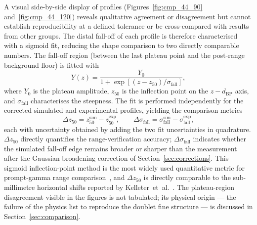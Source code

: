 \documentclass[a4paper]{article}
\begin{document}
A visual side-by-side display of profiles (Figures~\ref{fig:cmp_44_90} and~\ref{fig:cmp_44_120}) reveals qualitative agreement or disagreement but cannot establish reproducibility at a defined tolerance or be cross-compared with results from other groups. The distal fall-off of each profile is therefore characterised with a sigmoid fit, reducing the shape comparison to two directly comparable numbers. The fall-off region (between the last plateau point and the post-range background floor) is fitted with
\begin{equation}
    Y(z) = \frac{Y_0}{1 + \exp\!\left[(z - z_{50})/\sigma_\mathrm{fall}\right]},
    \label{eq:sigmoid}
\end{equation}
where $Y_0$ is the plateau amplitude, $z_{50}$ is the inflection point on the $z - d_\mathrm{BP}$ axis, and $\sigma_\mathrm{fall}$ characterises the steepness. The fit is performed independently for the corrected simulated and experimental profiles, yielding the comparison metrics
\begin{equation}
    \Delta z_{50} = z_{50}^\mathrm{sim} - z_{50}^\mathrm{exp}, \qquad
    \Delta\sigma_\mathrm{fall} = \sigma_\mathrm{fall}^\mathrm{sim} - \sigma_\mathrm{fall}^\mathrm{exp},
    \label{eq:deltaz50}
\end{equation}
each with uncertainty obtained by adding the two fit uncertainties in quadrature. $\Delta z_{50}$ directly quantifies the range-verification accuracy; $\Delta\sigma_\mathrm{fall}$ indicates whether the simulated fall-off edge remains broader or sharper than the measurement after the Gaussian broadening correction of Section~\ref{sec:corrections}. This sigmoid inflection-point method is the most widely used quantitative metric for prompt-gamma range comparison~\cite{janssen2014,pinto2015,valencialozano2023}, and $\Delta z_{50}$ is directly comparable to the sub-millimetre horizontal shifts reported by Kelleter~et~al.~\cite{kelleter2017}. The plateau-region disagreement visible in the figures is not tabulated; its physical origin — the failure of the physics list to reproduce the doublet fine structure — is discussed in Section~\ref{sec:comparison}.
\end{document}
